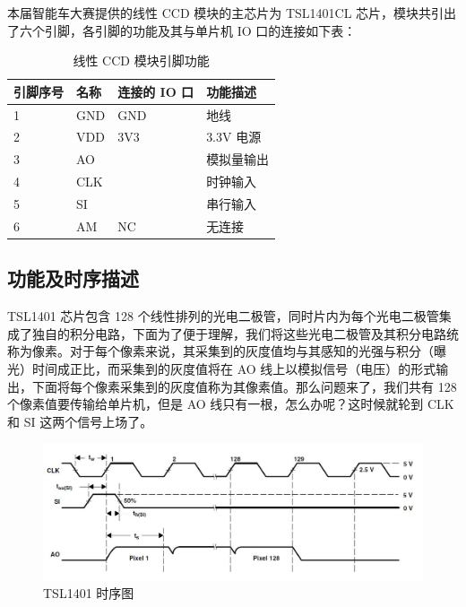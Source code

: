 本届智能车大赛提供的线性 CCD 模块的主芯片为 TSL1401CL 芯片，模块共引出了六个引脚，各引脚的功能及其与单片机 IO 口的连接如下表：

\begin{table}[]
 \centering
 \captionsetup{labelformat=empty}
 \caption{线性 CCD 模块引脚功能}
 \label{ccd_pinouts}
 \begin{tabular}{|l|l|l|l|}
  \hline
  引脚序号 & 名称 & 连接的 IO 口 & 功能描述    \\ \hline
  1            & GND    & GND              & 地线          \\
  2            & VDD    & 3V3              & 3.3V 电源     \\
  3            & AO     &                  & 模拟量输出 \\
  4            & CLK    &                  & 时钟输入    \\
  5            & SI     &                  & 串行输入    \\
  6            & AM     & NC               & 无连接       \\ \hline
 \end{tabular}
\end{table}

\subsection{功能及时序描述}

TSL1401 芯片包含 128 个线性排列的光电二极管，同时片内为每个光电二极管集成了独自的积分电路，下面为了便于理解，我们将这些光电二极管及其积分电路统称为像素。对于每个像素来说，其采集到的灰度值均与其感知的光强与积分（曝光）时间成正比，而采集到的灰度值将在 AO 线上以模拟信号（电压）的形式输出，下面将每个像素采集到的灰度值称为其像素值。那么问题来了，我们共有 128 个像素值要传输给单片机，但是 AO 线只有一根，怎么办呢？这时候就轮到 CLK 和 SI 这两个信号上场了。

\begin{figure}[h]
\centering %
\includegraphics[width=.8\textwidth]{tsl1401_timing.jpg}
\caption{TSL1401 时序图}
\label{tsl1401_timing}
\end{figure}

